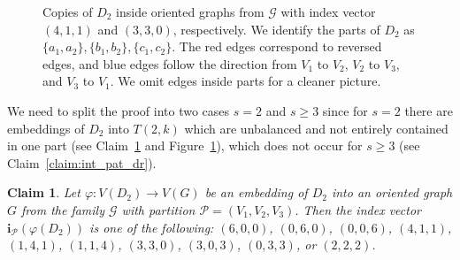 \documentclass[11pt]{amsart}
\newtheorem{claim}[theorem]{Claim}
\newcommand{\CP}{\mathcal{P}}
\newcommand{\G}{\mathcal{G}}
\begin{document}
\begin{figure}
    \caption{Copies of $D_2$ inside oriented graphs from $\G$ with index vector $(4,1,1)$ and $(3,3,0)$, respectively. We identify the parts of $D_2$ as $\{a_1, a_2\},\{b_1, b_2\},\{c_1, c_2\}$. The red edges correspond to reversed edges, and blue edges follow the direction from $V_1$ to $V_2$, $V_2$ to $V_3$, and $V_3$ to $V_1$. We omit edges inside parts for a cleaner picture.}
    \label{fig:411pattern}
\end{figure}

We need to split the proof into two cases $s=2$ and $s\ge 3$ since for $s=2$ there are embeddings of $D_2$ into $T(2,k)$ which are unbalanced and not entirely contained in one part (see Claim~\ref{claim:int_pat} and Figure~\ref{fig:411pattern}), which does not occur for $s\ge 3$ (see Claim~\ref{claim:int_pat_dr}). 

\begin{claim} \label{claim:int_pat}
    Let $\varphi: V(D_2) \to V(G)$ be an embedding of $D_2$ into an oriented graph $G$ from the family $\G$ with partition $\CP = (V_1,V_2,V_3)$.
    Then the index vector $\mathbf{i}_\CP(\varphi(D_2))$ is one of the following: $(6,0,0)$, $(0,6,0)$, $(0,0,6)$, $(4,1,1)$, $(1,4,1)$, $(1,1,4)$, $(3,3,0)$, $(3,0,3)$, $(0,3,3)$, or $(2,2,2)$.
\end{claim}
\end{document}
